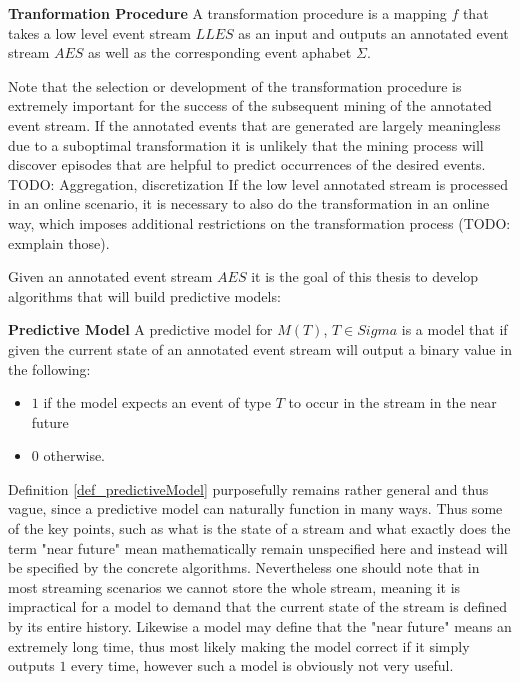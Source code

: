 \begin{mydef}
\textbf{Tranformation Procedure} A transformation procedure is a mapping $f$ that takes a low level event stream $LLES$ as an input and outputs an annotated event stream $AES$ as well as the corresponding event aphabet $\Sigma$.
\end{mydef}

Note that the selection or development of the transformation procedure is extremely important for the success of the subsequent mining of the annotated event stream. If the annotated events that are generated are largely meaningless due to a suboptimal transformation it is unlikely that the mining process will discover episodes that are helpful to predict occurrences of the desired events. 
TODO: Aggregation, discretization
If the low level annotated stream is processed in an online scenario, it is necessary to also do the transformation in an online way, which imposes additional restrictions on the transformation process (TODO: exmplain those).

Given an annotated event stream $AES$ it is the goal of this thesis to develop algorithms that will build predictive models:

\begin{mydef}
\label{def_predictiveModel}
\textbf{Predictive Model} A predictive model for $M(T)$, $T \in Sigma$ is a model that if given the current state of an annotated event stream will output a binary value in the following:
\begin{itemize}
	\item $1$ if the model expects an event of type $T$ to occur in the stream in the near future
	\item 0 otherwise.
\end{itemize} 
\end{mydef}

Definition \ref{def_predictiveModel} purposefully remains rather general and thus vague, since a predictive model can naturally function in many ways. Thus some of the key points, such as what is the state of a stream and what exactly does the term "near future" mean mathematically remain unspecified here and instead will be specified by the concrete algorithms. 
Nevertheless one should note that in most streaming scenarios we cannot store the whole stream, meaning it is impractical for a model to demand that the current state of the stream is defined by its entire history. Likewise a model may define that the "near future" means an extremely long time, thus most likely making the model correct if it simply outputs $1$ every time, however such a model is obviously not very useful.
